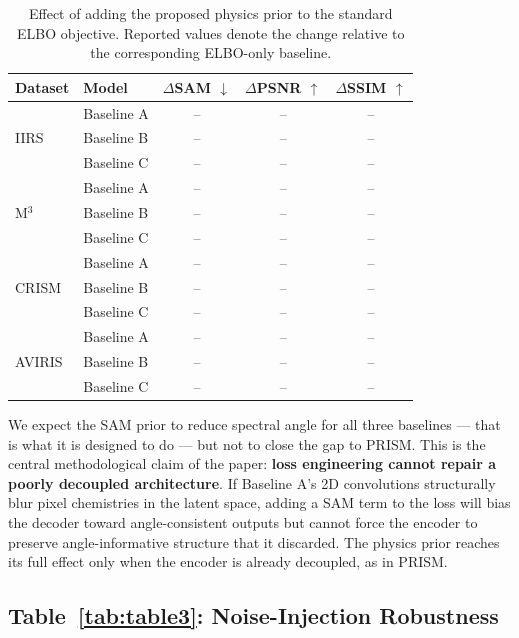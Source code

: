 \documentclass{article} %
\begin{document}
\begin{table}[t]
\centering
\small
\setlength{\tabcolsep}{6pt}
\begin{tabular}{llccc}
\toprule
\textbf{Dataset} &
\textbf{Model} &
$\Delta$SAM $\downarrow$ &
$\Delta$PSNR $\uparrow$ &
$\Delta$SSIM $\uparrow$ \\
\midrule

\multirow{3}{*}{IIRS}
& Baseline A & -- & -- & -- \\
& Baseline B & -- & -- & -- \\
& Baseline C & -- & -- & -- \\
\midrule

\multirow{3}{*}{M$^3$}
& Baseline A & -- & -- & -- \\
& Baseline B & -- & -- & -- \\
& Baseline C & -- & -- & -- \\
\midrule

\multirow{3}{*}{CRISM}
& Baseline A & -- & -- & -- \\
& Baseline B & -- & -- & -- \\
& Baseline C & -- & -- & -- \\
\midrule

\multirow{3}{*}{AVIRIS}
& Baseline A & -- & -- & -- \\
& Baseline B & -- & -- & -- \\
& Baseline C & -- & -- & -- \\

\bottomrule
\end{tabular}
\caption{
Effect of adding the proposed physics prior to the standard ELBO objective. Reported values denote the change relative to the corresponding ELBO-only baseline.
}
\label{tab:table2}
\end{table}


We expect the SAM prior to reduce spectral angle for all three baselines --- that is what it is designed to do --- but not to close the gap to PRISM. This is the central methodological claim of the paper: \textbf{loss engineering cannot repair a poorly decoupled architecture}. If Baseline A's 2D convolutions structurally blur pixel chemistries in the latent space, adding a SAM term to the loss will bias the decoder toward angle-consistent outputs but cannot force the encoder to preserve angle-informative structure that it discarded. The physics prior reaches its full effect only when the encoder is already decoupled, as in PRISM.

\subsection{Table~\ref{tab:table3}: Noise-Injection Robustness}
\end{document}
